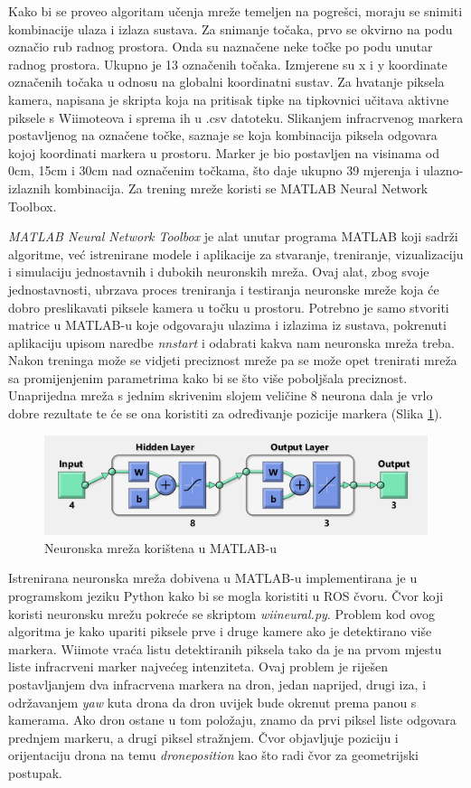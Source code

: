 \documentclass[times, utf8, diplomski]{fer}
\begin{document}
Kako bi se proveo algoritam učenja mreže temeljen na pogrešci, moraju se snimiti kombinacije ulaza i izlaza sustava. Za snimanje točaka, prvo se okvirno na podu označio rub radnog prostora. Onda su naznačene neke točke po podu unutar radnog prostora. Ukupno je 13  označenih točaka. Izmjerene su x i y koordinate označenih točaka u odnosu na globalni koordinatni sustav. Za hvatanje piksela kamera, napisana je skripta koja na pritisak tipke na tipkovnici učitava aktivne piksele s Wiimoteova i sprema ih u .csv datoteku. Slikanjem infracrvenog markera postavljenog na označene točke, saznaje se koja kombinacija piksela odgovara kojoj koordinati markera u prostoru. Marker je bio postavljen na visinama od 0cm, 15cm i 30cm nad označenim točkama, što daje ukupno 39 mjerenja i ulazno-izlaznih kombinacija. Za trening mreže koristi se MATLAB Neural Network Toolbox.

\textit{MATLAB Neural Network Toolbox} je alat unutar programa MATLAB koji sadrži algoritme, već istrenirane modele i aplikacije za stvaranje, treniranje, vizualizaciju i simulaciju jednostavnih i dubokih neuronskih mreža. Ovaj alat, zbog svoje jednostavnosti, ubrzava proces treniranja i testiranja neuronske mreže koja će dobro preslikavati piksele kamera u točku u prostoru. Potrebno je samo stvoriti matrice u MATLAB-u koje odgovaraju ulazima i izlazima iz sustava, pokrenuti aplikaciju upisom naredbe \textit{nnstart} i odabrati kakva nam neuronska mreža treba. Nakon treninga može se vidjeti preciznost mreže pa se može opet trenirati mreža sa promijenjenim parametrima kako bi se što više poboljšala preciznost. Unaprijedna mreža s jednim skrivenim slojem veličine 8 neurona dala je vrlo dobre rezultate te će se ona koristiti za određivanje pozicije markera (Slika \ref{fig:mreza8}).

\begin{figure}[h]
\centering
\includegraphics[width=.7\textwidth]{mreza}
\caption{Neuronska mreža korištena u MATLAB-u}
\label{fig:mreza8}
\end{figure} 

Istrenirana neuronska mreža dobivena u MATLAB-u implementirana je u programskom jeziku Python kako bi se mogla koristiti u ROS čvoru. Čvor koji koristi neuronsku mrežu pokreće se skriptom \textit{wii\textunderscore neural.py}. Problem kod ovog algoritma je kako upariti piksele prve i druge kamere ako je detektirano više markera. Wiimote vraća listu detektiranih piksela tako da je na prvom mjestu liste infracrveni marker najvećeg intenziteta. Ovaj problem je riješen postavljanjem dva infracrvena markera na dron, jedan naprijed, drugi iza, i održavanjem \textit{yaw} kuta drona da dron uvijek bude okrenut prema panou s kamerama. Ako dron ostane u tom položaju, znamo da prvi piksel liste odgovara prednjem markeru, a drugi piksel stražnjem. Čvor objavljuje poziciju i orijentaciju drona na temu \textit{drone\textunderscore position} kao što radi čvor za geometrijski postupak.
\end{document}
